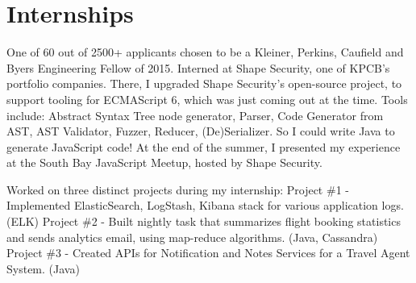 \documentclass[letterpaper]{deedy-resume} %
\begin{document}
\newpage %

\begin{minipage}[t]{0.29\textwidth} %

\section{}

\end{minipage} %
\hfill
\begin{minipage}[t]{0.7\textwidth} %


\section{Internships}

\vspace{\topsep} %

One of 60 out of 2500+ applicants chosen to be a Kleiner, Perkins, Caufield and Byers Engineering Fellow of 2015. Interned at Shape Security, one of KPCB's portfolio companies. There, I upgraded Shape Security's open-source project, to support tooling for ECMAScript 6, which was just coming out at the time. Tools include: Abstract Syntax Tree node generator, Parser, Code Generator from AST, AST Validator, Fuzzer, Reducer, (De)Serializer. So I could write Java to generate JavaScript code! At the end of the summer, I presented my experience at the South Bay JavaScript Meetup, hosted by Shape Security. 

\sectionsep %



Worked on three distinct projects during my internship:
Project \#1 - Implemented ElasticSearch, LogStash, Kibana stack for various application logs. (ELK)
Project \#2 - Built nightly task that summarizes flight booking statistics and sends analytics email, using map-reduce algorithms. (Java, Cassandra)
Project \#3 - Created APIs for Notification and Notes Services for a Travel Agent System. (Java)


\end{minipage}
\end{document}
